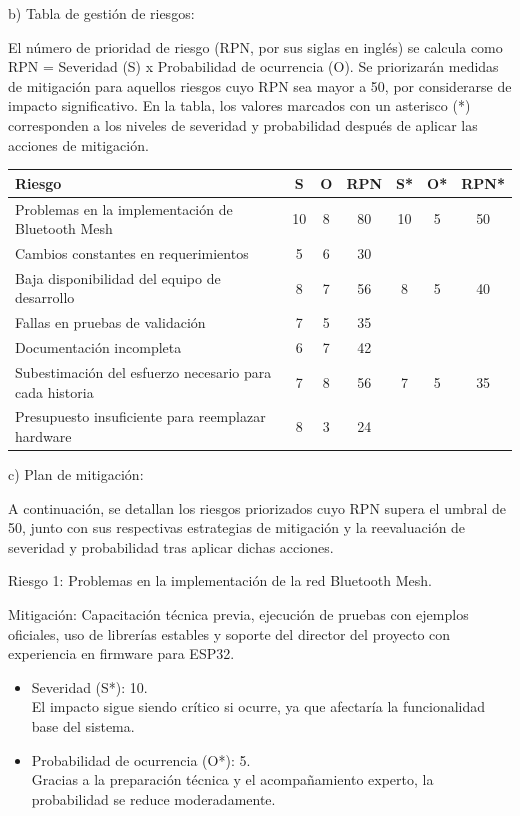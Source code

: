 \documentclass[
11pt, %
]{charter}
\begin{document}
b) Tabla de gestión de riesgos:


El número de prioridad de riesgo (RPN, por sus siglas en inglés) se calcula como RPN = Severidad (S) x Probabilidad de ocurrencia (O). Se priorizarán medidas de mitigación para aquellos riesgos cuyo RPN sea mayor a 50, por considerarse de impacto significativo. En la tabla, los valores marcados con un asterisco (*) corresponden a los niveles de severidad y probabilidad después de aplicar las acciones de mitigación.

\begin{table}[htpb]
\centering
\begin{tabularx}{\linewidth}{@{}|X|c|c|c|c|c|c|@{}}
\hline
\rowcolor[HTML]{C0C0C0} 
Riesgo & S & O & RPN & S* & O* & RPN* \\ \hline
Problemas en la implementación de Bluetooth Mesh       &
10   & 8  &  80   & 10    & 5   & 50     \\ \hline
Cambios constantes en requerimientos       &   
5   & 6  &  30   &    &    &      \\ \hline
Baja disponibilidad del equipo de desarrollo       &
8    & 7  &  56   & 8   & 5   & 40     \\ \hline
Fallas en pruebas de validación       &   
7    & 5  &  35   &    &    &      \\ \hline
Documentación incompleta       &   
6    & 7  &  42   &    &    &      \\ \hline
Subestimación del esfuerzo necesario para cada historia     &
7    & 8  &  56  & 7    & 5   & 35 \\ \hline
Presupuesto insuficiente para reemplazar hardware       & 
8    & 3  &  24  &    &    &      \\ \hline
\end{tabularx}%
\end{table}

c) Plan de mitigación:

A continuación, se detallan los riesgos priorizados cuyo RPN supera el umbral de 50, junto con sus respectivas estrategias de mitigación y la reevaluación de severidad y probabilidad tras aplicar dichas acciones.

Riesgo 1: Problemas en la implementación de la red Bluetooth Mesh.

Mitigación: Capacitación técnica previa, ejecución de pruebas con ejemplos oficiales, uso de librerías estables y soporte del director del proyecto con experiencia en firmware para ESP32.

\begin{itemize}
	\item Severidad (S*): 10. \\
	El impacto sigue siendo crítico si ocurre, ya que afectaría la funcionalidad base del sistema.
	\item Probabilidad de ocurrencia (O*): 5. \\
	Gracias a la preparación técnica y el acompañamiento experto, la probabilidad se reduce moderadamente.
\end{itemize}   
\end{document}
